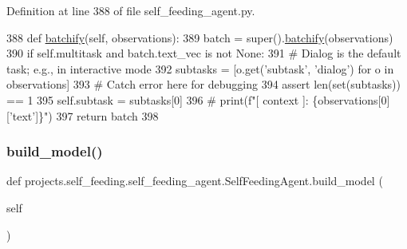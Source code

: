 Definition at line 388 of file self\+\_\+feeding\+\_\+agent.\+py.


\begin{DoxyCode}
388     \textcolor{keyword}{def }\hyperlink{namespaceparlai_1_1agents_1_1drqa_1_1utils_aca22dd97c5b6dcda2a7479c1cb22ef1e}{batchify}(self, observations):
389         batch = super().\hyperlink{namespaceparlai_1_1agents_1_1drqa_1_1utils_aca22dd97c5b6dcda2a7479c1cb22ef1e}{batchify}(observations)
390         \textcolor{keywordflow}{if} self.multitask \textcolor{keywordflow}{and} batch.text\_vec \textcolor{keywordflow}{is} \textcolor{keywordflow}{not} \textcolor{keywordtype}{None}:
391             \textcolor{comment}{# Dialog is the default task; e.g., in interactive mode}
392             subtasks = [o.get(\textcolor{stringliteral}{'subtask'}, \textcolor{stringliteral}{'dialog'}) \textcolor{keywordflow}{for} o \textcolor{keywordflow}{in} observations]
393             \textcolor{comment}{# Catch error here for debugging}
394             \textcolor{keyword}{assert} len(set(subtasks)) == 1
395             self.subtask = subtasks[0]
396         \textcolor{comment}{# print(f"[ context ]: \{observations[0]['text']\}")}
397         \textcolor{keywordflow}{return} batch
398 
\end{DoxyCode}
\mbox{\label{classprojects_1_1self__feeding_1_1self__feeding__agent_1_1SelfFeedingAgent_af80537d5c439bd9c475e252e533e24cc}} 
\subsubsection{\texorpdfstring{build\+\_\+model()}{build\_model()}}
{\footnotesize\ttfamily def projects.\+self\+\_\+feeding.\+self\+\_\+feeding\+\_\+agent.\+Self\+Feeding\+Agent.\+build\+\_\+model (\begin{DoxyParamCaption}\item[{}]{self }\end{DoxyParamCaption})}




